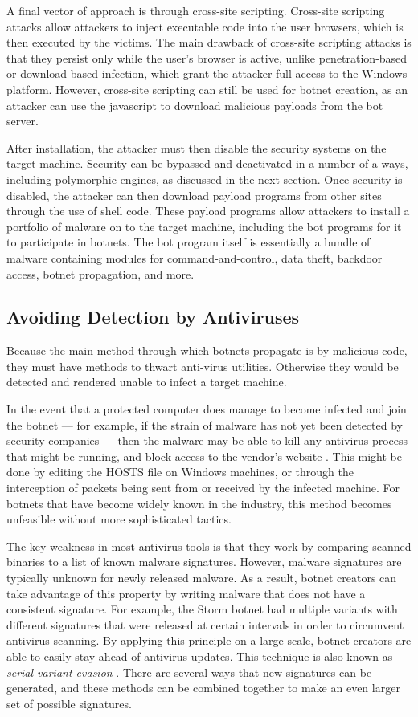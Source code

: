 \documentclass{acm_proc_article-sp}
\begin{document}
A final vector of approach is through cross-site scripting.  Cross-site scripting attacks allow attackers to inject executable code into the user browsers, which is then executed by the victims.  The main drawback of cross-site scripting attacks is that they persist only while the user's browser is active, unlike penetration-based or download-based infection, which grant the attacker full access to the Windows platform. However, cross-site scripting can still be used for botnet creation, as an attacker can use the javascript to download malicious payloads from the bot server\cite{defcon:javascript}.

After installation, the attacker must then disable the security systems on the target machine. Security can be bypassed and deactivated in a number of a ways, including polymorphic engines, as discussed in the next section. Once security is disabled, the attacker can then download payload programs from other sites through the use of shell code.  These payload programs allow attackers to install a portfolio of malware on to the target machine, including the bot programs for it to participate in botnets.  The bot program itself is essentially a bundle of malware containing modules for command-and-control, data theft, backdoor access, botnet propagation, and more.

\subsection{Avoiding Detection by Antiviruses}
Because the main method through which botnets propagate is by malicious code, they must have methods to thwart anti-virus utilities. Otherwise they would be detected and rendered unable to infect a target machine. 

In the event that a protected computer does manage to become infected and join the botnet --- for example, if the strain of malware has not yet been detected by security companies --- then the malware may be able to kill any antivirus process that might be running, and block access to the vendor's website \cite{barford:book}. This might be done by editing the HOSTS file on Windows machines, or through the interception of packets being sent from or received by the infected machine. For botnets that have become widely known in the industry, this method becomes unfeasible without more sophisticated tactics.

The key weakness in most antivirus tools is that they work by comparing scanned binaries to a list of known malware signatures. However, malware signatures are typically unknown for newly released malware. As a result, botnet creators can take advantage of this property by writing malware that does not have a consistent signature. For example, the Storm botnet had multiple variants with different signatures that were released at certain intervals in order to circumvent antivirus scanning. By applying this principle on a large scale, botnet creators are able to easily stay ahead of antivirus updates. This technique is also known as \emph{serial variant evasion} \cite{ollmann:evasion}. There are several ways that new signatures can be generated, and these methods can be combined together to make an even larger set of possible signatures.
\end{document}
